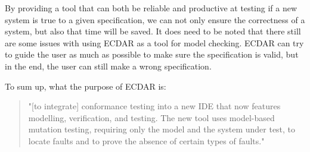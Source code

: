 By providing a tool that can both be reliable and productive at testing if a new system is true to a given specification, we can not only ensure the correctness of a system, but also that time will be saved.
It does need to be noted that there still are some issues with using ECDAR as a tool for model checking.
ECDAR can try to guide the user as much as possible to make sure the specification is valid, but in the end, the user can still make a wrong specification.


To sum up, what the purpose of ECDAR is:
\begin{quote}
"[to integrate] conformance testing into a new IDE that now features
modelling, verification, and testing. The new tool uses model-based mutation testing, requiring only
the model and the system under test, to locate faults and to prove the absence of certain types of faults." \cite{Gundersen_2018}
\end{quote}



